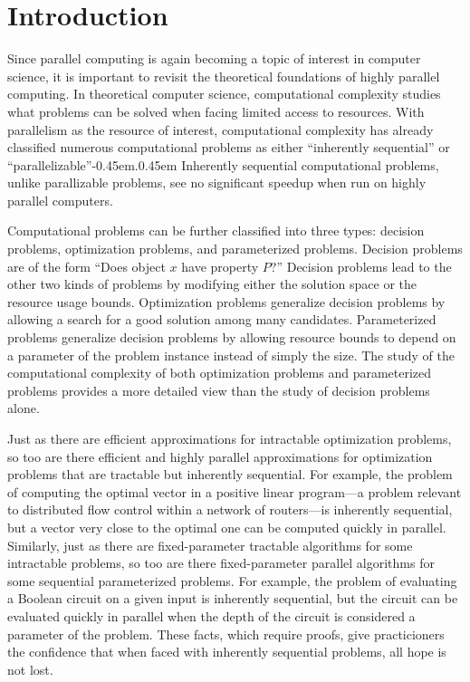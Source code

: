\chapter{Introduction}

%
%
%
Since parallel computing is again becoming a topic of interest in computer science, it is important to revisit the theoretical foundations of highly parallel computing.
In theoretical computer science, computational complexity studies what problems can be solved when facing limited access to resources.
With parallelism as the resource of interest, computational complexity has already classified numerous computational problems as either ``inherently sequential'' or ``parallelizable''\kern-0.45em.\kern0.45em
Inherently sequential computational problems, unlike parallizable problems, see no significant speedup when run on highly parallel computers.

Computational problems can be further classified into three types: decision problems, optimization problems, and parameterized problems.
Decision problems are of the form ``Does object $x$ have property $P$?''
Decision problems lead to the other two kinds of problems by modifying either the solution space or the resource usage bounds.
Optimization problems generalize decision problems by allowing a search for a good solution among many candidates.
Parameterized problems generalize decision problems by allowing resource bounds to depend on a parameter of the problem instance instead of simply the size.
The study of the computational complexity of both optimization problems and parameterized problems provides a more detailed view than the study of decision problems alone.

%
%
%
Just as there are efficient approximations for intractable optimization problems, so too are there efficient and highly parallel approximations for optimization problems that are tractable but inherently sequential.
For example, the problem of computing the optimal vector in a positive linear program---a problem relevant to distributed flow control within a network of routers---is inherently sequential, but a vector very close to the optimal one can be computed quickly in parallel.
Similarly, just as there are fixed-parameter tractable algorithms for some intractable problems, so too are there fixed-parameter parallel algorithms for some sequential parameterized problems.
For example, the problem of evaluating a Boolean circuit on a given input is inherently sequential, but the circuit can be evaluated quickly in parallel when the depth of the circuit is considered a parameter of the problem.
These facts, which require proofs, give practicioners the confidence that when faced with inherently sequential problems, all hope is not lost.

